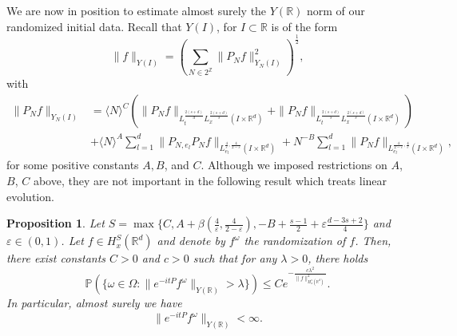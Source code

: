 \documentclass[10pt,leqno]{amsart}
\newtheorem{prop}[thm]{Proposition}
\newcommand{\R}{\mathbb{R}}
\numberwithin{equation}{section}
\newcommand{\Z}{\mathbb{Z}}
\begin{document}
We are now in position to estimate almost surely the $Y(\R)$ norm of our randomized initial data. Recall that $Y(I )$, for $I\subset \R$ is of the form
$$\|f\|_{Y(I)} = \left(\sum_{N\in 2^{\Z}}  \|P_N f\|_{Y_N(I)}^2\right)^{\frac{1}{2}},$$
with
\begin{align*}
\|P_N f\|_{Y_N(I)}&= \langle N\rangle^C \left(\|P_N f\|_{L_t^{\frac{2(s+d)}{d}} L_x^{\frac{2(s+d)}{s}} (I\times \R^d)} +\|P_N f\|_{L_t^{\frac{2(s+d)}{s}} L_x^{\frac{2(s+d)}{s}}(I\times \R^d) } \right)\\
&+\langle N\rangle^A \sum_{l=1}^d \|P_{N,e_l} P_N f \|_{L^{\frac{4}{\varepsilon},\frac{4}{2-\varepsilon}}_{e_l}(I\times \R^d) } +N^{-B} \sum_{l=1}^d \|P_N f\|_{L^{\frac{4}{2-\varepsilon},\frac{4}{\varepsilon}}_{e_l} (I\times \R^d) },  
\end{align*}
for some positive constants $A,B$, and $C$. Although we imposed restrictions on $A$, $B$, $C$ above, they are not important in the following result which treats linear evolution. 


\begin{prop}
\label{estY}
Let $S= \max\{C, A+\beta (\frac{4}{\varepsilon} , \frac{4}{2-\varepsilon}), -B+\frac{s-1}{2} + \varepsilon  \frac{d -3s+2}{4} \}$ and $\varepsilon \in (0, 1)$. Let $f\in H_x^S (\R^d)$ and denote by $f^\omega$ the randomization of $f$. Then, there exist constants $C>0$ and $c>0$ such that for any $\lambda >0$, there holds
$$\mathbb{P} \left(\{ \omega \in \Omega : \| e^{-it P} f^\omega \|_{Y(\R)} >\lambda \} \right) \leq C e^{-\frac{c \lambda^2}{ \|f\|_{H_x^s (\R^d )}^{2}} }.$$
In particular, almost surely we have
$$\| e^{-it P} f^\omega \|_{Y(\R)} <\infty. $$
\end{prop}
\end{document}
